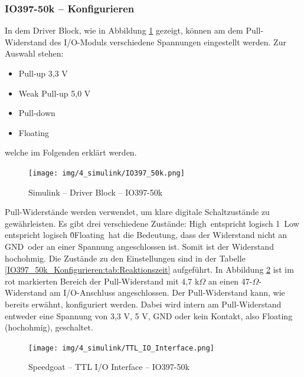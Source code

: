 \subsubsection{IO397-50k – Konfigurieren}
\label{Simulink:IO397_50k_Konfigurieren}

In dem Driver Block, wie in Abbildung \ref{IO397_50k_Konfigurieren:img:Driver_Block} gezeigt, können am dem Pull-Widerstand des I/O-Moduls verschiedene Spannungen eingestellt werden. Zur Auswahl stehen:
\begin{itemize}
	\item Pull-up 3,3 V
	\item Weak Pull-up 5,0 V
	\item Pull-down
	\item Floating
\end{itemize}
welche im Folgenden erklärt werden.

\pagebreak[1]
\begin{figure}[!ht]
	\begin{center}
		\texttt{[image: img/4\_simulink/IO397\_50k.png]}
		\caption{Simulink – Driver Block – IO397-50k}
		\label{IO397_50k_Konfigurieren:img:Driver_Block}
	\end{center}
\end{figure}
\pagebreak[1]

Pull-Widerstände werden verwendet, um klare digitale Schaltzustände zu gewährleisten. Es gibt drei verschiedene Zustände: \frqq High\flqq\ entspricht \frqq logisch 1\flqq\, Low entspricht \frqq logisch 0\flqq\. \frqq Floating\flqq\ hat die Bedeutung, dass der Widerstand nicht an \frqq GND\flqq\ oder an einer Spannung angeschlossen ist. Somit ist der Widerstand hochohmig. Die Zustände zu den Einstellungen sind in der Tabelle \ref{IO397_50k_Konfigurieren:tab:Reaktionszeit} aufgeführt.
In Abbildung \ref{IO397_50k_Konfigurieren:img:TTL_IO_Interface} ist im rot markierten Bereich der Pull-Widerstand mit 4,7 k$\Omega$ an einen 47-$\Omega$-Widerstand am I/O-Anschluss angeschlossen. Der Pull-Widerstand kann, wie bereits erwähnt, konfiguriert werden. Dabei wird intern am Pull-Widerstand entweder eine Spannung von 3,3 V, 5 V, GND oder kein Kontakt, also Floating (hochohmig), geschaltet.

\pagebreak[1]
\begin{figure}[!ht]
	\begin{center}
		\texttt{[image: img/4\_simulink/TTL\_IO\_Interface.png]}
		\caption{Speedgoat – TTL I/O Interface – IO397-50k \cite[12]{speedgoat:IO397_50k}}
		\label{IO397_50k_Konfigurieren:img:TTL_IO_Interface}
	\end{center}
\end{figure}
\pagebreak[2]



